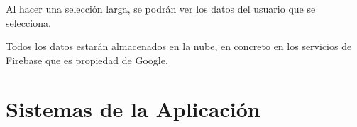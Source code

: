 	\bigskip
	Al hacer una selección larga, se podrán ver los datos del usuario que se selecciona.

	Todos los datos estarán almacenados en la nube, en concreto en los servicios de Firebase\cite{6:firebase:online} que es propiedad de Google\cite{18:google:online}.

\section{Sistemas de la Aplicación}